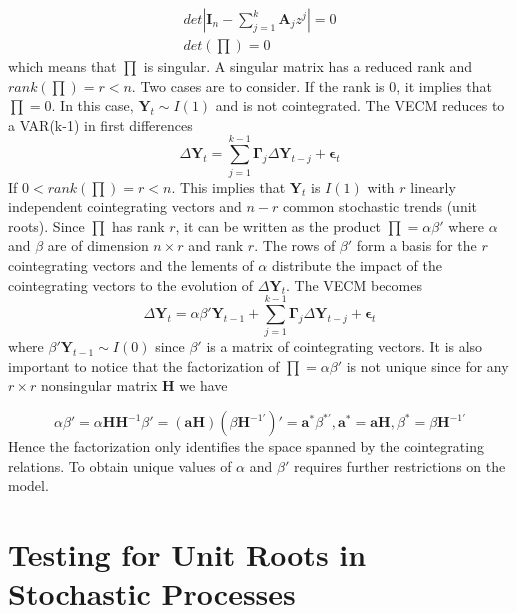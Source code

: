 \documentclass[11pt,a4,twosided,singlespacing,titlepagenumber=on]{scrreprt}
\newcommand{\matr}[1]{\mathbf{#1}} %
\numberwithin{equation}{chapter} %
\theoremstyle{remark}
\begin{document}
\begin{align*}
det |\matr{I}_n - \sum_{j=1}^k \matr{A}_j z^j| = 0 \\
det \left(\prod \right) = 0
\end{align*}
which means that $\prod$ is singular. A singular matrix has a reduced rank and $rank(\prod) = r < n$. Two cases are to consider. If the rank is 0, it implies that $\prod = 0$. In this case, $\matr{Y}_t \sim I(1)$ and is not cointegrated. The VECM reduces to a VAR(k-1) in first differences
$$\Delta \matr{Y}_t = \sum_{j=1}^{k-1} \matr{\Gamma}_j \Delta \matr{Y}_{t-j} + \matr{\epsilon}_t $$
If $0 < rank(\prod) = r < n$. This implies that $\matr{Y}_t$ is $I(1)$ with $r$ linearly independent cointegrating vectors and $n-r$ common stochastic trends (unit roots). Since $\prod$ has rank $r$, it can be written as the product $\prod = \alpha \beta'$ where $\alpha$ and $\beta$ are of dimension $n \times r$ and rank $r$.  The rows of $\beta'$ form a basis for the $r$ cointegrating vectors and the lements of $\alpha$ distribute the impact of the cointegrating vectors to the evolution of $\Delta \matr{Y}_t$. The VECM becomes
$$\Delta \matr{Y}_t = \alpha \beta' \matr{Y}_{t-1} + \sum_{j=1}^{k-1} \matr{\Gamma}_j \Delta \matr{Y}_{t-j} + \matr{\epsilon}_t $$
where $\beta' \matr{Y}_{t-1} \sim I(0)$ since $\beta'$ is a matrix of cointegrating vectors. It is also important to notice that the factorization of $\prod = \alpha \beta'$ is not unique since for any $r \times r$ nonsingular matrix $\matr{H}$ we have

$$\alpha \beta' = \alpha \matr{H} \matr{H}^{-1} \beta' = (\matr{a}\matr{H})(\beta \matr{H}^{-1'})' = \matr{a}^* \beta^{*'}, \matr{a}^* = \matr{a}\matr{H}, \beta^* = \beta \matr{H}^{-1'}$$
Hence the factorization only identifies the space spanned by the cointegrating relations. To obtain unique values of $\alpha$ and $\beta'$ requires further restrictions on the model.

\section{Testing for Unit Roots in Stochastic Processes}
\end{document}
